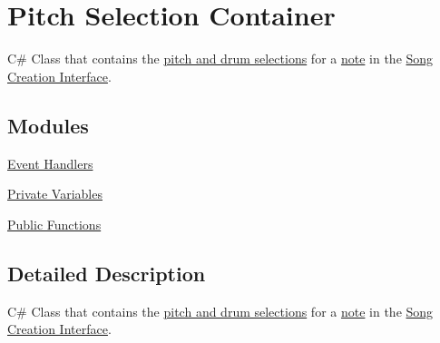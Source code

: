 \hypertarget{group___doc_s_c___p_s_c}{}\section{Pitch Selection Container}
\label{group___doc_s_c___p_s_c}


C\# Class that contains the \hyperlink{group___doc_s_c___p_s_t}{pitch and drum selections} for a \hyperlink{group___music_structs_struct_music_1_1_combined_note}{note} in the \hyperlink{group___doc_s_c}{Song Creation Interface}.  


\subsection*{Modules}
\begin{DoxyCompactItemize}
\item 
\hyperlink{group___s_c___p_s_c_handlers}{Event Handlers}
\item 
\hyperlink{group___s_c___p_s_c_priv_var}{Private Variables}
\item 
\hyperlink{group___s_c___p_s_c_pub_func}{Public Functions}
\end{DoxyCompactItemize}


\subsection{Detailed Description}
C\# Class that contains the \hyperlink{group___doc_s_c___p_s_t}{pitch and drum selections} for a \hyperlink{group___music_structs_struct_music_1_1_combined_note}{note} in the \hyperlink{group___doc_s_c}{Song Creation Interface}. 

